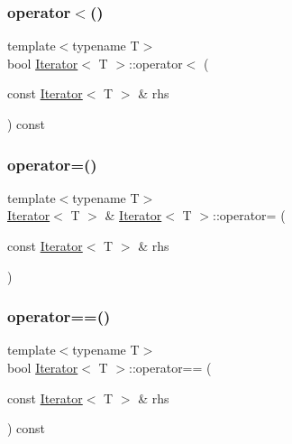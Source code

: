 \mbox{\label{classIterator_ad39301c065fa58593a3d89155f1b8587}} 
\subsubsection{\texorpdfstring{operator$<$()}{operator<()}}
{\footnotesize\ttfamily template$<$typename T$>$ \\
bool \hyperlink{classIterator}{Iterator}$<$ T $>$\+::operator$<$ (\begin{DoxyParamCaption}\item[{const \hyperlink{classIterator}{Iterator}$<$ T $>$ \&}]{rhs }\end{DoxyParamCaption}) const}

\mbox{\label{classIterator_ada84e69bbc46c63419f81b57b613ccd3}} 
\subsubsection{\texorpdfstring{operator=()}{operator=()}}
{\footnotesize\ttfamily template$<$typename T$>$ \\
\hyperlink{classIterator}{Iterator}$<$ T $>$ \& \hyperlink{classIterator}{Iterator}$<$ T $>$\+::operator= (\begin{DoxyParamCaption}\item[{const \hyperlink{classIterator}{Iterator}$<$ T $>$ \&}]{rhs }\end{DoxyParamCaption})}

\mbox{\label{classIterator_aff009192cf339f15c98018879d1ddba5}} 
\subsubsection{\texorpdfstring{operator==()}{operator==()}}
{\footnotesize\ttfamily template$<$typename T$>$ \\
bool \hyperlink{classIterator}{Iterator}$<$ T $>$\+::operator== (\begin{DoxyParamCaption}\item[{const \hyperlink{classIterator}{Iterator}$<$ T $>$ \&}]{rhs }\end{DoxyParamCaption}) const}



